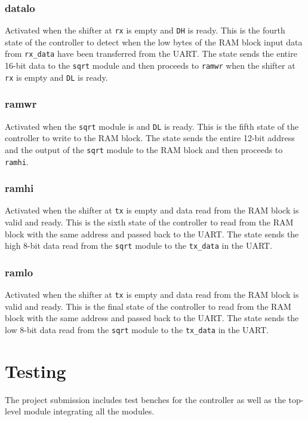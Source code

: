 \documentclass[paper=usletter, fontsize=12pt]{article}
\begin{document}
            \subsubsection{datalo} Activated when the shifter at \texttt{rx} is
            empty and \texttt{DH} is ready. This is the fourth state of the
            controller to detect when the low bytes of the RAM block input data
            from \texttt{rx\_data} have been transferred from the UART. The
            state sends the entire 16-bit data to the \texttt{sqrt} module and
            then proceeds to \texttt{ramwr} when the shifter at \texttt{rx} is
            empty and \texttt{DL} is ready.

            \subsubsection{ramwr} Activated when the \texttt{sqrt} module is
            and \texttt{DL} is ready. This is the fifth state of the controller
            to write to the RAM block. The state sends the entire 12-bit
            address and the output of the \texttt{sqrt} module to the RAM block
            and then proceeds to \texttt{ramhi}.

            \subsubsection{ramhi} Activated when the shifter at \texttt{tx} is
            empty and data read from the RAM block is valid and ready. This is
            the sixth state of the controller to read from the RAM block with
            the same address and passed back to the UART. The state sends the
            high 8-bit data read from the \texttt{sqrt} module to the
            \texttt{tx\_data} in the UART.

            \subsubsection{ramlo} Activated when the shifter at \texttt{tx} is
            empty and data read from the RAM block is valid and ready. This is
            the final state of the controller to read from the RAM block with
            the same address and passed back to the UART. The state sends the
            low 8-bit data read from the \texttt{sqrt} module to the
            \texttt{tx\_data} in the UART.

    \section{Testing} The project submission includes test benches for the
    controller as well as the top-level module integrating all the modules.
\end{document}
